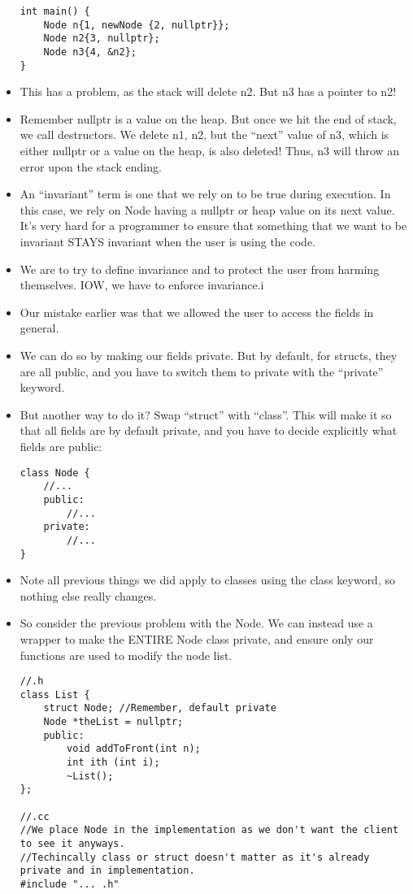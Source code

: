 \documentclass{article}
\begin{document}
\begin{itemize}
\begin{lstlisting}
int main() {
    Node n{1, newNode {2, nullptr}};
    Node n2{3, nullptr};
    Node n3{4, &n2};
}
\end{lstlisting}
\item This has a problem, as the stack will delete n2.  But n3 has a pointer to n2!
\item Remember nullptr is a value on the heap.  But once we hit the end of stack, we call destructors.  We delete n1, n2, but the ``next'' value of n3, which is either nullptr or a value on the heap, is also deleted!  Thus, n3 will throw an error upon the stack ending.
\item An ``invariant'' term is one that we rely on to be true during execution.  In this case, we rely on Node having a nullptr or heap value on its next value.  It's very hard for a programmer to ensure that something that we want to be invariant STAYS invariant when the user is using the code.  
\item We are to try to define invariance and to protect the user from harming themselves.  IOW, we have to enforce invariance.i
\item Our mistake earlier was that we allowed the user to access the fields in general.
\item We can do so by making our fields private.  But by default, for structs, they are all public, and you have to switch them to private with the ``private'' keyword.
\item But another way to do it?  Swap ``struct'' with ``class''.  This will make it so that all fields are by default private, and you have to decide explicitly what fields are public:
\begin{lstlisting}
class Node {
    //...
    public:
        //...  
    private:
        //...
}
\end{lstlisting}
\item Note all previous things we did apply to classes using the class keyword, so nothing else really changes.
\item So consider the previous problem with the Node.  We can instead use a wrapper to make the ENTIRE Node class private, and ensure only our functions are used to modify the node list.
\begin{lstlisting}
//.h
class List {
    struct Node; //Remember, default private
    Node *theList = nullptr;
    public:
        void addToFront(int n);
        int ith (int i);
        ~List();
};

//.cc
//We place Node in the implementation as we don't want the client to see it anyways.
//Techincally class or struct doesn't matter as it's already private and in implementation.
#include "... .h"


\end{lstlisting}
\end{itemize}
\end{document}
